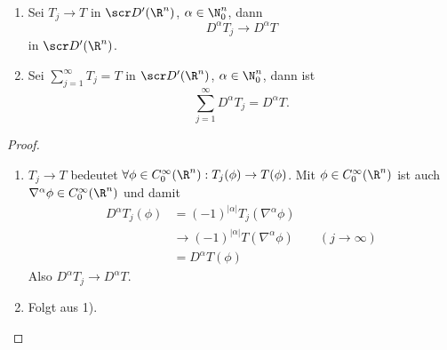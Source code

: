 \begin{st} \label{5.16}
	\begin{enumerate}[1)]
		\item
			Sei $T_j \to T$ in $\scr D'(\R^n)$, $\alpha \in \N_0^n$, dann
			\[
				D^\alpha T_j \to D^\alpha T
			\]
			in $\scr D'(\R^n)$.
		\item
			Sei $\sum_{j=1}^\infty T_j = T$ in $\scr D'(\R^n)$, $\alpha \in \N_0^n$, dann ist
			\[
				\sum_{j=1}^\infty D^\alpha T_j = D^\alpha T.
			\]
	\end{enumerate}
	\begin{proof}
		\begin{enumerate}[1)]
			\item
				$T_j \to T$ bedeutet $\forall \phi \in C_0^\infty(\R^n) : T_j(\phi) \to T(\phi)$.
				Mit $\phi \in C_0^\infty(\R^n)$ ist auch $\nabla^\alpha \phi \in C_0^\infty (\R^n)$ und damit
				\begin{align*}
					D^\alpha T_j(\phi)
					&= (-1)^{|\alpha|} T_j(\nabla^\alpha \phi) \\
					&\to (-1)^{|\alpha|} T(\nabla^\alpha \phi) \qquad (j\to \infty) \\
					&= D^\alpha T(\phi)
				\end{align*}
				Also $D^\alpha T_j \to D^\alpha T$.
			\item
				Folgt aus 1).
		\end{enumerate}
	\end{proof}
\end{st}

